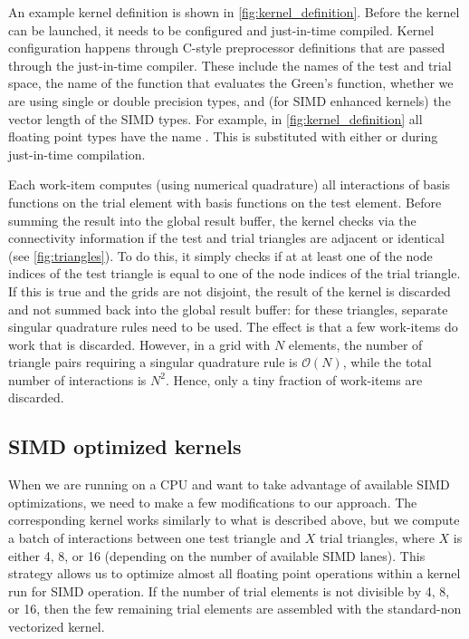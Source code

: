 An example kernel definition is shown in \cref{fig:kernel_definition}.
Before the kernel can be launched, it needs to be configured and just-in-time compiled. Kernel configuration happens through C-style preprocessor definitions that are passed through the just-in-time compiler. These include the names of the test and trial space, the name of the function that evaluates the Green's function, whether we are using single or double precision types, and (for SIMD enhanced kernels) the vector length of the SIMD types.
For example, in \cref{fig:kernel_definition} all floating point types have the name . This is substituted with either  or  during just-in-time compilation.

Each work-item computes (using numerical quadrature) all interactions of basis functions on the trial element with basis functions on the test element. Before summing the result into the global result buffer, the kernel checks via the connectivity information if the test and trial triangles are adjacent or identical (see \cref{fig:triangles}). To do this, it simply checks if at at least one of the node indices of the test triangle is equal to one of the node indices of the trial triangle. If this is true and the grids are not disjoint, the result of the kernel is discarded and not summed back into the global result buffer: for these triangles, separate singular quadrature rules need to be used. The effect is that a few work-items do work that is discarded. However, in a grid with $N$ elements, the number of triangle pairs requiring a singular quadrature rule is $\mathcal{O}(N)$, while the total number of interactions is $N^2$. Hence, only a tiny fraction of work-items are discarded.

\subsection{SIMD optimized kernels}
When we are running on a CPU and want to take advantage of available SIMD optimizations, we need to make a few modifications to our approach. The corresponding kernel works similarly to what is described above, but we compute a batch of interactions between one test triangle and $X$ trial triangles, where $X$ is either 4, 8, or 16 (depending on the number of available SIMD lanes). This strategy allows us to optimize almost all floating point operations within a kernel run for SIMD operation. If the number of trial elements is not divisible by 4, 8, or 16, then the few remaining trial elements are assembled with the standard-non vectorized kernel.

